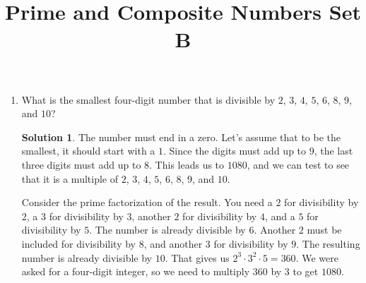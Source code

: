 \documentclass{article}
\title{Prime and Composite Numbers Set B}
\date{}
\author{}
\theoremstyle{definition}
\newtheorem*{solution}{Solution}
\begin{document}
\maketitle

\begin{multicols}{2}
    \begin{enumerate}
        \item What is the smallest four-digit number that is divisible by $2$, $3$, $4$, $5$, $6$,
            $8$, $9$, and $10$?
            \begin{solution}
                The number must end in a zero.
                Let's assume that to be the smallest, it should start with a $1$.
                Since the digits must add up to $9$, the last three digits must add up to $8$.
                This leads us to $1080$, and we can test to see that it is a multiple of $2$, $3$,
                $4$, $5$, $6$, $8$, $9$, and $10$.

                Consider the prime factorization of the result.
                You need a $2$ for divisibility by $2$, a $3$ for divisibility by $3$,
                another $2$ for divisibility by $4$, and a $5$ for divisibility by $5$.
                The number is already divisible by $6$.
                Another $2$ must be included for divisibility by $8$, and another $3$ for
                divisibility by $9$.
                The resulting number is already divisible by $10$.
                That gives us $2^3 \cdot 3^2 \cdot 5 = 360$.
                We were asked for a four-digit integer,
                so we need to multiply $360$ by $3$ to get $1080$.


\end{solution}
\end{enumerate}
\end{multicols}
\end{document}
